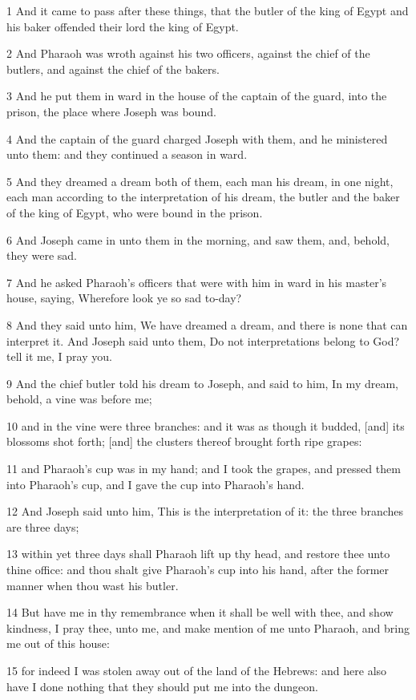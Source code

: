 \par 1 And it came to pass after these things, that the butler of the king of Egypt and his baker offended their lord the king of Egypt.
\par 2 And Pharaoh was wroth against his two officers, against the chief of the butlers, and against the chief of the bakers.
\par 3 And he put them in ward in the house of the captain of the guard, into the prison, the place where Joseph was bound.
\par 4 And the captain of the guard charged Joseph with them, and he ministered unto them: and they continued a season in ward.
\par 5 And they dreamed a dream both of them, each man his dream, in one night, each man according to the interpretation of his dream, the butler and the baker of the king of Egypt, who were bound in the prison.
\par 6 And Joseph came in unto them in the morning, and saw them, and, behold, they were sad.
\par 7 And he asked Pharaoh's officers that were with him in ward in his master's house, saying, Wherefore look ye so sad to-day?
\par 8 And they said unto him, We have dreamed a dream, and there is none that can interpret it. And Joseph said unto them, Do not interpretations belong to God? tell it me, I pray you.
\par 9 And the chief butler told his dream to Joseph, and said to him, In my dream, behold, a vine was before me;
\par 10 and in the vine were three branches: and it was as though it budded, [and] its blossoms shot forth; [and] the clusters thereof brought forth ripe grapes:
\par 11 and Pharaoh's cup was in my hand; and I took the grapes, and pressed them into Pharaoh's cup, and I gave the cup into Pharaoh's hand.
\par 12 And Joseph said unto him, This is the interpretation of it: the three branches are three days;
\par 13 within yet three days shall Pharaoh lift up thy head, and restore thee unto thine office: and thou shalt give Pharaoh's cup into his hand, after the former manner when thou wast his butler.
\par 14 But have me in thy remembrance when it shall be well with thee, and show kindness, I pray thee, unto me, and make mention of me unto Pharaoh, and bring me out of this house:
\par 15 for indeed I was stolen away out of the land of the Hebrews: and here also have I done nothing that they should put me into the dungeon.
